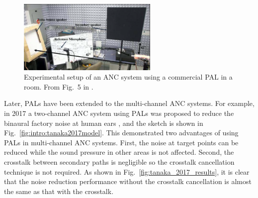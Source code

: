\begin{figure}[!htb]
    \centering
    \includegraphics[width = 0.6\textwidth]{fig/ganguly2014fig5_resize.png}
    \caption{Experimental setup of an ANC system using a commercial PAL in a room. From Fig.~5 in \cite{Ganguly2014RealtimeRemoteCancellation}.}
    \label{fig:ganguly2014}
\end{figure}

Later, PALs {have been} extended to the multi-channel ANC systems. 
{For example, in} 2017 a two-channel ANC system using PALs was proposed to reduce the binaural factory noise at human ears \cite{Tanaka2017BinauralActiveNoise}, and the sketch is shown in Fig.~\ref{fig:intro:tanaka2017model}.
{This} demonstrated two advantages of using PALs in multi-channel ANC systems.
First, the noise at target points can be reduced while the sound pressure in other areas is not affected.
Second, the crosstalk between secondary paths is negligible so the crosstalk cancellation technique is not required. 
As shown in Fig.~\ref{fig:tanaka_2017_results}, it is clear that the noise reduction performance without the crosstalk cancellation is almost the same as that with the crosstalk.

